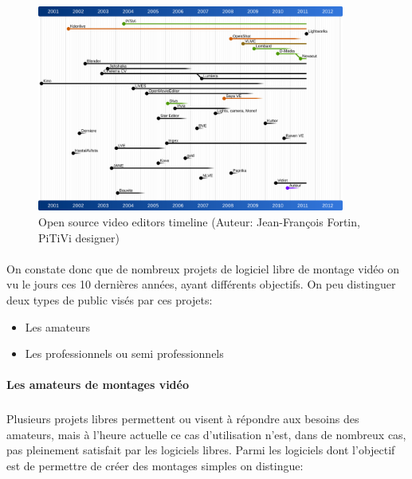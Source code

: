 \begin{figure} [h]
  \begin{center}
    \includegraphics[width=0.9\textwidth]{images/open-source-video-editor-timeline}
  \end{center} \caption{Open source video editors timeline (Auteur:
  Jean-François Fortin, PiTiVi designer)} \label{Yes}
\end{figure}

\paragraph{ }

On constate donc que de nombreux projets de logiciel libre de montage
vidéo on vu le jours ces 10 dernières années, ayant différents
objectifs.  On peu distinguer deux types de public visés par ces projets:

\begin {itemize}

  \item {Les amateurs}

  \item {Les professionnels ou semi professionnels}
\end {itemize}

\paragraph {Les amateurs de montages vidéo}

\subparagraph{}

Plusieurs projets libres permettent ou visent à répondre aux besoins
des amateurs, mais à l'heure actuelle ce cas d'utilisation n'est, dans
de nombreux cas, pas pleinement satisfait par les logiciels libres. Parmi
les logiciels dont l'objectif est de permettre de créer des montages
simples on distingue:


